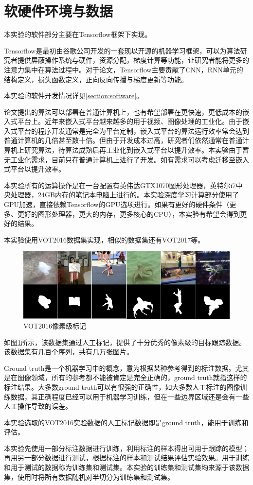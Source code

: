\section{软硬件环境与数据}
本实验的软件部分主要在Tensorflow\supercite{abadi2016tensorflow}框架下实现。
\par
Tensorflow是最初由谷歌公司开发的一套现以开源的机器学习框架，可以为算法研究者提供屏蔽操作系统与硬件，资源分配，梯度计算等功能，让研究者能将更多的注意力集中在算法过程中。对于论文，Tensorflow主要贡献了CNN，RNN单元的结构定义，损失函数定义，正向反向传播与梯度更新等功能。
\par
本实验的软件开发情况详见\ref{section:software}。
\par
论文提出的算法可以部署在普通计算机上，也有希望部署在更快速，更低成本的嵌入式平台上。近年来嵌入式平台越来越多的用于视频、图像处理的工业化。由于嵌入式平台的程序开发通常是完全为平台定制，嵌入式平台的算法运行效率常会达到普通计算机的几倍甚至数十倍。但由于开发成本过高，研究者们依然通常在普通计算机上研究算法，待算法成熟后再工业化到嵌入式平台以提升效率。本实验由于暂无工业化需求，目前只在普通计算机上进行了开发。如有需求可以考虑迁移至嵌入式平台以提升效率。
\par
本实验所有的运算操作是在一台配置有英伟达GTX1070图形处理器，英特尔i7中央处理器，24GB内存的笔记本电脑上进行的。本实验深度学习计算部分使用了GPU加速，直接依赖Tensorflow的GPU选项进行。如果有更好的硬件条件（更多、更好的图形处理器，更大的内存，更多核心的CPU），本实验有希望会得到更好的结果。
\par
本实验使用VOT2016数据集\supercite{Vojir-TR-2017-01}实现，相似的数据集还有VOT2017等。
\par
\begin{figure}[htbp!]
    \centering
    \includegraphics[width = 1.\textwidth]{chap/img/vot_2016_pixel.png}
    \caption{VOT2016像素级标记}\label{fig:vot_2016_pixel}
\end{figure}
\par
如图\ref{fig:vot_2016_pixel}所示，该数据集通过人工标记，提供了十分优秀的像素级的目标跟踪数据。该数据集有几百个序列，共有几万张图片。
\par
Ground truth是一个机器学习中的概念，意为根据某种参考得到的标注数据。尤其是在图像领域，所有的参考都不能被肯定是完全正确的，ground truth就指这样的标注结果。大多数ground truth可以有很强的正确性，如大多数人工标注的图像训练数据，其正确程度已经可以用于机器学习训练，但在一些边界区域还是会有一些人工操作导致的误差。
\par
本实验选取的VOT2016实验数据的人工标记数据即是ground truth，能用于训练和评估。
\par
本实验先使用一部分标注数据进行训练，利用标注的样本得出可用于跟踪的模型；再用另一部分数据进行测试，根据标注的样本和测试结果评估实验效果。用于训练和用于测试的数据称为训练集和测试集。本实验的训练集和测试集均来源于该数据集，使用时将所有数据随机对半切分为训练集和测试集。

